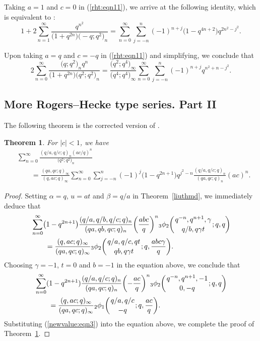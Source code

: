 \documentclass[10pt,a4paper]{amsart}
\numberwithin{equation}{section}
\newtheorem{Theorem}{Theorem}[section]
\begin{document}
Taking $a=1$ and $c=0$ in (\ref{rht:eqn11}), we arrive at the following identity, which is equivalent to \cite[equation~(2.6)]{WangChern2019}:
\begin{equation*}%
1+2\sum_{n=1}^\infty \frac{q^{n^2}}{\bigl(1+q^{2n}\bigr)\bigl(-q; q^2\bigr)_n}
=\sum_{n=0}^\infty \sum_{j=-n}^n (-1)^{n+j} \bigl(1-q^{4n+2}\bigr) q^{2n^2-j^2}.
\end{equation*}

Upon taking $a=q$ and $c=-q$ in (\ref{rht:eqn11}) and simplifying, we conclude that
\begin{equation*}%
2\sum_{n=0}^\infty \frac{\bigl(q; q^2\bigr)_n q^n}{\bigl(1+q^{2n}\bigr)\bigl(q^2; q^2\bigr)_n}
=\frac{\bigl(q^2; q^4\bigr)_\infty}{\bigl(q^4; q^4\bigr)_\infty}
\sum_{n=0}^\infty \sum_{j=-n}^n (-1)^{n+j} q^{n^2+n-j^2}.
\end{equation*}	

\subsection{More Rogers--Hecke type series. Part II}
 The following theorem is the corrected version of \cite[Theorem~4.10]{Liu2013IJTN}.
\begin{Theorem}\label{eulerthm} For $|c|<1$, we have
	\begin{align}
		&\sum_{n=0}^\infty \frac{(q/a, q/c; q)_n (ac/q)^n}{\bigl(q^2; q^2\bigr)_n}\nonumber\\
		&\qquad{}=\frac{(qa, qc; q)_\infty} {(q, ac; q)_\infty}
		\sum_{n=0}^\infty \sum_{j=-n}^n (-1)^j \bigl(1-q^{2n+1}\bigr) q^{j^2-n}
		\frac{(q/a, q/c; q)_n}{(qa, qc; q)_n}(ac)^n.\label{euler:eqn1}
	\end{align}	
\end{Theorem}
\begin{proof}
Setting $\alpha=q$, $u=at$ and $\beta=q/a$ in Theorem~\ref{liuthmd}, we immediately deduce that
\begin{align*}%
	&\sum_{n=0}^\infty\bigl(1-q^{2n+1}\bigr) \frac{(q/a, q/b, q/c; q)_n}{(qa, qb, qc; q)_n} \biggl(\frac{abc}{q}\biggr)^n {_3\phi_2}\biggl({{q^{-n}, q^{n+1}, \gamma}\atop{q/b, q\gamma t}}; q, q\biggr)\\
	&\qquad{}=\frac{(q, ac; q)_\infty}{(qa, qc; q)_\infty}
	{_3\phi_2}\biggl({{q/a, q/c, qt}\atop{qb, q\gamma t}}; q, \frac{abc\gamma}{q}\biggr).\nonumber
\end{align*}	
Choosing $\gamma=-1$, $t=0$ and $b=-1$ in the equation above, we conclude that
\begin{align*}
	&\sum_{n=0}^\infty (1-q^{2n+1})\frac{(q/a, q/c; q)_n}{(qa, qc; q)_n}\biggl(-\frac{ ac}{q}\biggr)^n {_3\phi_2}\biggl({{q^{-n}, q^{n+1}, -1}\atop{0, -q}}; q, q\biggr)\nonumber\\
	&\qquad{}=\frac{(q, ac; q)_\infty}{(qa, qc; q)_\infty} {_2\phi_1} \biggl({{q/a, q/c}\atop{-q}}; q, \frac{ac}{q} \biggr).%
\end{align*}
Substituting (\ref{newvalue:eqn3}) into the equation above, we complete the proof of Theorem~\ref{eulerthm}.
\end{proof}
\end{document}
